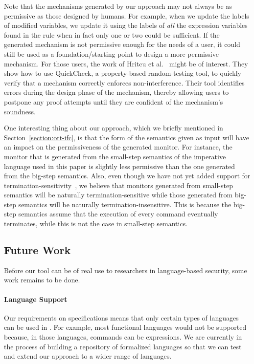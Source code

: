 \documentclass[conference]{IEEEtran}
\begin{document}
Note that the mechanisms generated by our approach may not always be as permissive as those designed by humans. For example, when we update the labels of modified variables, we update it using the labels of \emph{all} the expression variables found in the rule when in fact only one or two could be sufficient. If the generated mechanism is not permissive enough for the needs of a user, it could still be used as a foundation/starting point to design a more permissive mechanism. For those users, the work of Hritcu et al.~\cite{DBLP:journals/jfp/HritcuLSADHPV16} might be of interest. They show how to use QuickCheck, a property-based random-testing tool, to quickly verify that a mechanism correctly enforces non-interference. Their tool identifies errors during the design phase of the mechanism, thereby allowing users to postpone any proof attempts until they are confident of the mechanism's soundness.

One interesting thing about our approach, which we briefly mentioned in Section~\ref{section:ott-ifc}, is that the form of the semantics given as input will have an impact on the permissiveness of the generated monitor. For instance, the monitor that is generated from the small-step semantics of the imperative language used in this paper is slightly less permissive than the one generated from the big-step semantics. Also, even though we have not yet added support for termination-sensitivity~\cite{DBLP:conf/esorics/AskarovHSS08}, we believe that monitors generated from small-step semantics will be naturally termination-sensitive while those generated from big-step semantics will be naturally termination-insensitive. This is because the big-step semantics assume that the execution of every command eventually terminates, while this is not the case in small-step semantics.



\subsection{Future Work}\label{section:future-work}
Before our tool can be of real use to researchers in language-based security, some work remains to be done.

\paragraph{Language Support} Our requirements on specifications means that only certain types of languages can be used in \ottifc. For example, most functional languages would not be supported because, in those languages, commands can be expressions. We are currently in the process of building a repository of formalized languages so that we can test and extend our approach to a wider range of languages.
\end{document}

